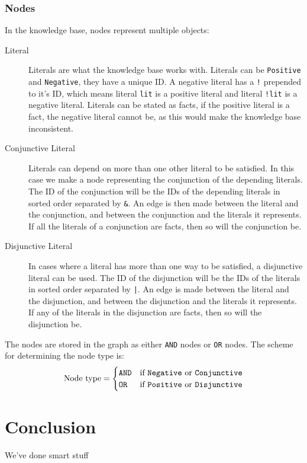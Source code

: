 \documentclass[11pt]{article}
\begin{document}
\subsubsection{Nodes}
In the knowledge base, nodes represent multiple objects:
\begin{description}
	\item[Literal] Literals are what the knowledge base works with. Literals can be {\tt Positive} and {\tt Negative}, they have a unique ID. A negative literal has a {\tt !} prepended to it's ID, which means literal {\tt lit} is a positive literal and literal {\tt !lit} is a negative literal. Literals can be stated as facts, if the positive literal is a fact, the negative literal cannot be, as this would make the knowledge base inconsistent.
	
	\item[Conjunctive Literal] Literals can depend on more than one other literal to be satisfied. In this case we make a node representing the conjunction of the depending literals. The ID of the conjunction will be the IDs of the depending literals in sorted order separated by {\tt \&}. An edge is then made between the literal and the conjunction, and between the conjunction and the literals it represents. If all the literals of a conjunction are facts, then so will the conjunction be.
	
	\item[Disjunctive Literal] In cases where a literal has more than one way to be satisfied, a disjunctive literal can be used. The ID of the disjunction will be the IDs of the literals in sorted order separated by {\tt |}. An edge is made between the literal and the disjunction, and between the disjunction and the literals it represents. If any of the literals in the disjunction are facts, then so will the disjunction be.
\end{description}

The nodes are stored in the graph as either {\tt AND} nodes or {\tt OR} nodes. The scheme for determining the node type is:
$$
\text{Node type} = \begin{cases}
  {\text{\tt AND}} & \text{if {\tt Negative} or {\tt Conjunctive}} \\
  {\text {\tt OR}} & \text{if {\tt Positive} or {\tt Disjunctive}}
\end{cases}
$$

\section{Conclusion}
We've done smart stuff
\end{document}
